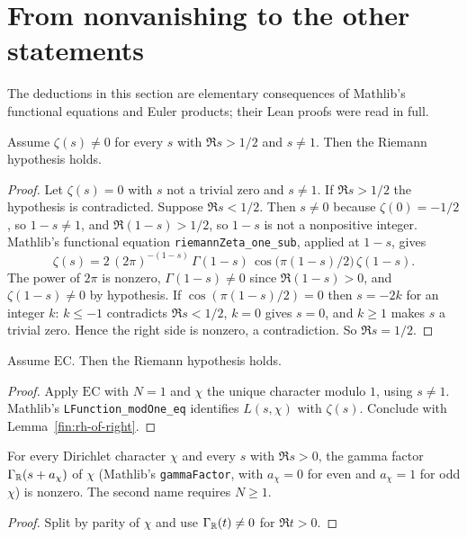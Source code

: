\section{From nonvanishing to the other statements}

The deductions in this section are elementary consequences of Mathlib's
functional equations and Euler products; their Lean proofs were read in full.

\begin{lemma}\label{fin:rh-of-right}
Assume $\zeta(s)\ne0$ for every $s$ with $\Re s>1/2$ and $s\ne1$. Then the
Riemann hypothesis holds.
\end{lemma}
\begin{proof}
Let $\zeta(s)=0$ with $s$ not a trivial zero and $s\ne1$. If $\Re s>1/2$ the
hypothesis is contradicted. Suppose $\Re s<1/2$. Then $s\ne0$ because
$\zeta(0)=-1/2$, so $1-s\ne1$, and $\Re(1-s)>1/2$, so $1-s$ is not a
nonpositive integer. Mathlib's functional equation \texttt{riemannZeta\_one\_sub},
applied at $1-s$, gives
\[
\zeta(s)=2\,(2\pi)^{-(1-s)}\,\Gamma(1-s)\,\cos\!\big(\pi(1-s)/2\big)\,\zeta(1-s).
\]
The power of $2\pi$ is nonzero, $\Gamma(1-s)\ne0$ since $\Re(1-s)>0$, and
$\zeta(1-s)\ne0$ by hypothesis. If $\cos(\pi(1-s)/2)=0$ then $s=-2k$ for an
integer $k$: $k\le-1$ contradicts $\Re s<1/2$, $k=0$ gives $s=0$, and $k\ge1$
makes $s$ a trivial zero. Hence the right side is nonzero, a contradiction. So
$\Re s=1/2$.
\end{proof}

\begin{lemma}\label{fin:rh-of-every}
Assume $\mathrm{EC}$. Then the Riemann hypothesis holds.
\end{lemma}
\begin{proof}
Apply $\mathrm{EC}$ with $N=1$ and $\chi$ the unique character modulo $1$, using
$s\ne1$. Mathlib's \texttt{LFunction\_modOne\_eq} identifies $L(s,\chi)$ with
$\zeta(s)$. Conclude with Lemma~\ref{fin:rh-of-right}.
\end{proof}

\begin{lemma}\label{fin:gamma}
For every Dirichlet character $\chi$ and every $s$ with $\Re s>0$, the gamma
factor $\Gamma_{\mathbb{R}}(s+a_{\chi})$ of $\chi$ (Mathlib's \texttt{gammaFactor}, with
$a_{\chi}=0$ for even and $a_{\chi}=1$ for odd $\chi$) is nonzero. The second name
requires $N\ge1$.
\end{lemma}
\begin{proof}
Split by parity of $\chi$ and use $\Gamma_{\mathbb{R}}(t)\ne0$ for $\Re t>0$.
\end{proof}

